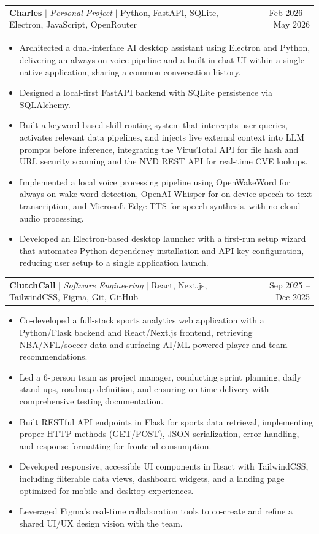 \documentclass[letterpaper,11pt]{article}
\makeatletter
\newcommand{\resumeItem}[1]{
  \item\small{
    {#1 \vspace{-2pt}}
  }
}
\newcommand{\resumeProjectHeading}[2]{
    \item
    \begin{tabular*}{0.97\textwidth}{l@{\extracolsep{\fill}}r}
      \small#1 & #2 \\
    \end{tabular*}\vspace{-7pt}
}
\newcommand{\resumeItemListStart}{\begin{itemize}[leftmargin=0.15in]}
\newcommand{\resumeItemListEnd}{\end{itemize}\vspace{-5pt}}
\makeatother
\begin{document}
      \resumeProjectHeading
          {\textbf{Charles} $|$ \emph{Personal Project} $|$ Python, FastAPI, SQLite, Electron, JavaScript, OpenRouter}{Feb 2026 -- May 2026}
      \resumeItemListStart
        \resumeItem{Architected a dual-interface AI desktop assistant using Electron and Python, delivering an always-on voice pipeline and a built-in chat UI within a single native application, sharing a common conversation history.}
        \resumeItem{Designed a local-first FastAPI backend with SQLite persistence via SQLAlchemy.}
        \resumeItem{Built a keyword-based skill routing system that intercepts user queries, activates relevant data pipelines, and injects live external context into LLM prompts before inference, integrating the VirusTotal API for file hash and URL security scanning and the NVD REST API for real-time CVE lookups.}
        \resumeItem{Implemented a local voice processing pipeline using OpenWakeWord for always-on wake word detection, OpenAI Whisper for on-device speech-to-text transcription, and Microsoft Edge TTS for speech synthesis, with no cloud audio processing.}
        \resumeItem{Developed an Electron-based desktop launcher with a first-run setup wizard that automates Python dependency installation and API key configuration, reducing user setup to a single application launch.}
      \resumeItemListEnd

      \resumeProjectHeading
          {\textbf{ClutchCall} $|$ \emph{Software Engineering} $|$ React, Next.js, TailwindCSS, Figma, Git, GitHub}{Sep 2025 -- Dec 2025}
      \resumeItemListStart
        \resumeItem{Co-developed a full-stack sports analytics web application with a Python/Flask backend and React/Next.js frontend, retrieving NBA/NFL/soccer data and surfacing AI/ML-powered player and team recommendations.}
        \resumeItem{Led a 6-person team as project manager, conducting sprint planning, daily stand-ups, roadmap definition, and ensuring on-time delivery with comprehensive testing documentation.}
        \resumeItem{Built RESTful API endpoints in Flask for sports data retrieval, implementing proper HTTP methods (GET/POST), JSON serialization, error handling, and response formatting for frontend consumption.}
        \resumeItem{Developed responsive, accessible UI components in React with TailwindCSS, including filterable data views, dashboard widgets, and a landing page optimized for mobile and desktop experiences.}
        \resumeItem{Leveraged Figma's real-time collaboration tools to co-create and refine a shared UI/UX design vision with the team.}
      \resumeItemListEnd
\end{document}

